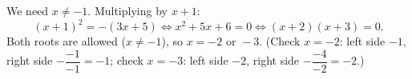 We need $x\ne-1$. Multiplying by $x+1$:
\[(x+1)^2=-(3x+5)\iff x^2+5x+6=0\iff(x+2)(x+3)=0.\]
Both roots are allowed ($x\ne-1$), so $x=\boxed{-2\text{ or }-3}$. (Check $x=-2$: left side $-1$, right side $-\dfrac{-1}{-1}=-1$; check $x=-3$: left side $-2$, right side $-\dfrac{-4}{-2}=-2$.)
